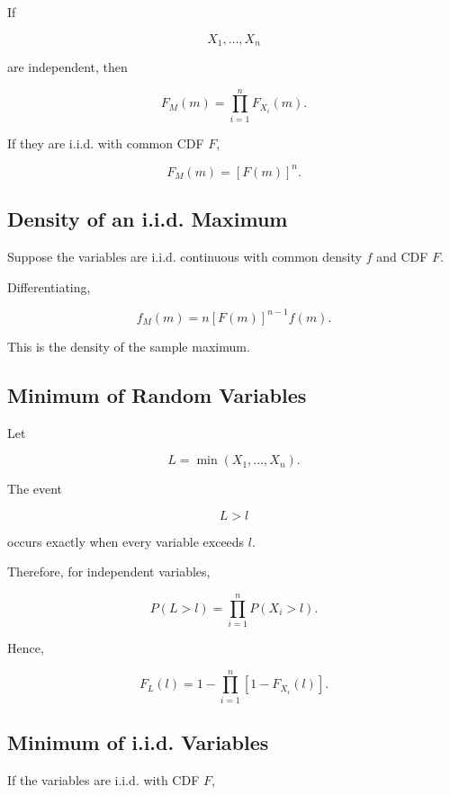 If

\[
X_1,\ldots,X_n
\]

are independent, then

\[
\boxed{
F_M(m)
=
\prod_{i=1}^{n}
F_{X_i}(m).
}
\]

If they are i.i.d. with common CDF \(F\),

\[
\boxed{
F_M(m)
=
[F(m)]^n.
}
\]

\subsection{Density of an i.i.d. Maximum}
\label{subsec:density-iid-maximum}

Suppose the variables are i.i.d. continuous with common density \(f\)
and CDF \(F\).

Differentiating,

\[
\boxed{
f_M(m)
=
n
[F(m)]^{n-1}
f(m).
}
\]

This is the density of the sample maximum.

\subsection{Minimum of Random Variables}
\label{subsec:minimum-random-variables}

Let

\[
L=\min(X_1,\ldots,X_n).
\]

The event

\[
L>l
\]

occurs exactly when every variable exceeds \(l\).

Therefore, for independent variables,

\[
P(L>l)
=
\prod_{i=1}^{n}
P(X_i>l).
\]

Hence,

\[
\boxed{
F_L(l)
=
1-
\prod_{i=1}^{n}
[1-F_{X_i}(l)].
}
\]

\subsection{Minimum of i.i.d. Variables}
\label{subsec:minimum-iid}

If the variables are i.i.d. with CDF \(F\),

